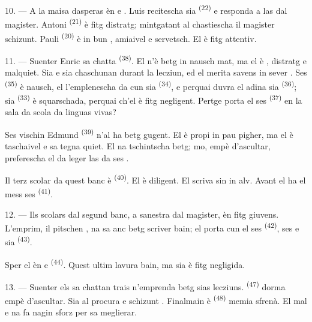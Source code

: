 10. --- A la maisa dasperas èn  e . Luis
recitescha sia  \textsuperscript{(22)} e responda a las
 dal magister. Antoni \textsuperscript{(21)} è fitg distratg;
mintgatant al chastiescha il magister schizunt. Pauli \textsuperscript{(20)} è in
bun , amiaivel e servetsch. El è fitg attentiv.

\VUsaut{4.2mm}
\VUsaut{3.2mm}

11. --- Suenter Enric sa chatta  \textsuperscript{(38)}. El n'è betg
in nausch mat, ma el è , distratg e malquiet. Sia
 e sia  chaschunan 
durant la lecziun, ed el merita savens in sever . Ses
 \textsuperscript{(35)} è nausch, el l'emplenescha da
 cun sia  \textsuperscript{(34)}, e perquai
duvra el adina sia  \textsuperscript{(36)}; sia
 \textsuperscript{(33)} è squarschada, perquai ch'el è fitg
negligent. Pertge porta el ses  \textsuperscript{(37)} en la sala
da scola da linguas vivas?

Ses vischin Edmund \textsuperscript{(39)} n'al ha betg gugent. El è propi in pau
pigher, ma el è taschaivel e sa tegna quiet. El na tschintscha betg; mo, empè
d'ascultar, preferescha el da leger las  da ses .

Il terz scolar da quest banc è  \textsuperscript{(40)}. El è diligent.
El scriva sin in  alv. Avant el ha el mess ses
 \textsuperscript{(41)}.

12. --- Ils scolars dal segund banc, a sanestra dal magister, èn fitg giuvens.
L'emprim, il pitschen , na sa anc betg scriver bain; el porta cun el
ses  \textsuperscript{(42)}, ses  e sia
 \textsuperscript{(43)}.

Sper el èn  e  \textsuperscript{(44)}. Quest ultim
lavura bain, ma sia  è fitg negligida.

13. --- Suenter els sa chattan trais  n'emprenda betg sias
lecziuns.  \textsuperscript{(47)} dorma empè d'ascultar. Sia
 al procura  e schizunt .
Finalmain è  \textsuperscript{(48)} memia sfrenà. El
 mal e na fa nagin sforz per sa meglierar.

